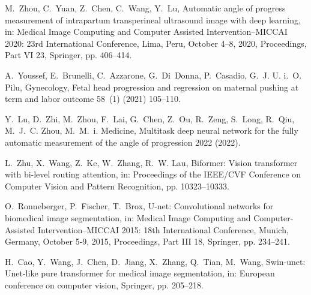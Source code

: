 \documentclass[preprint,12pt]{elsarticle}
\begin{document}
\begin{thebibliography}{10}
M.~Zhou, C.~Yuan, Z.~Chen, C.~Wang, Y.~Lu, Automatic angle of progress measurement of intrapartum transperineal ultrasound image with deep learning, in: Medical Image Computing and Computer Assisted Intervention–MICCAI 2020: 23rd International Conference, Lima, Peru, October 4–8, 2020, Proceedings, Part VI 23, Springer, pp. 406--414.

A.~Youssef, E.~Brunelli, C.~Azzarone, G.~Di~Donna, P.~Casadio, G.~J. U. i.~O. Pilu, Gynecology, Fetal head progression and regression on maternal pushing at term and labor outcome 58~(1) (2021) 105--110.

Y.~Lu, D.~Zhi, M.~Zhou, F.~Lai, G.~Chen, Z.~Ou, R.~Zeng, S.~Long, R.~Qiu, M.~J.~C. Zhou, M.~M.~i. Medicine, Multitask deep neural network for the fully automatic measurement of the angle of progression 2022 (2022).

L.~Zhu, X.~Wang, Z.~Ke, W.~Zhang, R.~W. Lau, Biformer: Vision transformer with bi-level routing attention, in: Proceedings of the IEEE/CVF Conference on Computer Vision and Pattern Recognition, pp. 10323--10333.

O.~Ronneberger, P.~Fischer, T.~Brox, U-net: Convolutional networks for biomedical image segmentation, in: Medical Image Computing and Computer-Assisted Intervention–MICCAI 2015: 18th International Conference, Munich, Germany, October 5-9, 2015, Proceedings, Part III 18, Springer, pp. 234--241.

H.~Cao, Y.~Wang, J.~Chen, D.~Jiang, X.~Zhang, Q.~Tian, M.~Wang, Swin-unet: Unet-like pure transformer for medical image segmentation, in: European conference on computer vision, Springer, pp. 205--218.




















\end{thebibliography}
\end{document}

